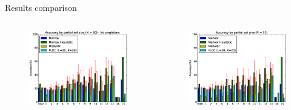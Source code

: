 \documentclass{beamer}
\begin{document}
\begin{frame}{Results comparison}
  \begin{columns}
    \begin{column}{0.5\textwidth}
      \begin{figure}
        \centering
        \includegraphics[width=\columnwidth]{set_size_score_50_no_singles}
      \end{figure}
    \end{column}
    \begin{column}{0.5\textwidth}
      \begin{figure}
        \centering
        \includegraphics[width=\columnwidth]{set_size_score_50}
      \end{figure}
    \end{column}
  \end{columns}
\end{frame}

%  
%  
\end{document}
